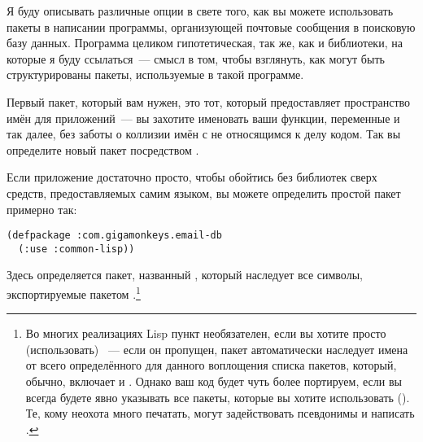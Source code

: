 Я буду описывать различные опции в свете того, как вы можете использовать пакеты в
написании программы, организующей почтовые сообщения в поисковую базу данных. Программа
целиком гипотетическая, так же, как и библиотеки, на которые я буду ссылаться~--- смысл в
том, чтобы взглянуть, как могут быть структурированы пакеты, используемые в такой
программе.

Первый пакет, который вам нужен, это тот, который предоставляет пространство имён для
приложений~--- вы захотите именовать ваши функции, переменные и так далее, без заботы о
коллизии имён с не относящимся к делу кодом. Так вы определите новый пакет посредством
.

Если приложение достаточно просто, чтобы обойтись без библиотек сверх средств,
предоставляемых самим языком, вы можете определить простой пакет примерно так:

\begin{lstlisting}
(defpackage :com.gigamonkeys.email-db
  (:use :common-lisp))
\end{lstlisting}

Здесь определяется пакет, названный , который наследует все
символы, экспортируемые пакетом .\footnote{Во многих реализациях Lisp
  пункт  необязателен, если вы хотите просто (использовать)
  ~--- если он пропущен, пакет автоматически наследует имена от всего
  определённого для данного воплощения списка пакетов, который, обычно, включает и
  . Однако ваш код будет чуть более портируем, если вы всегда будете
  явно указывать все пакеты, которые вы хотите использовать (). Те, кому
  неохота много печатать, могут задействовать псевдонимы и написать .}

